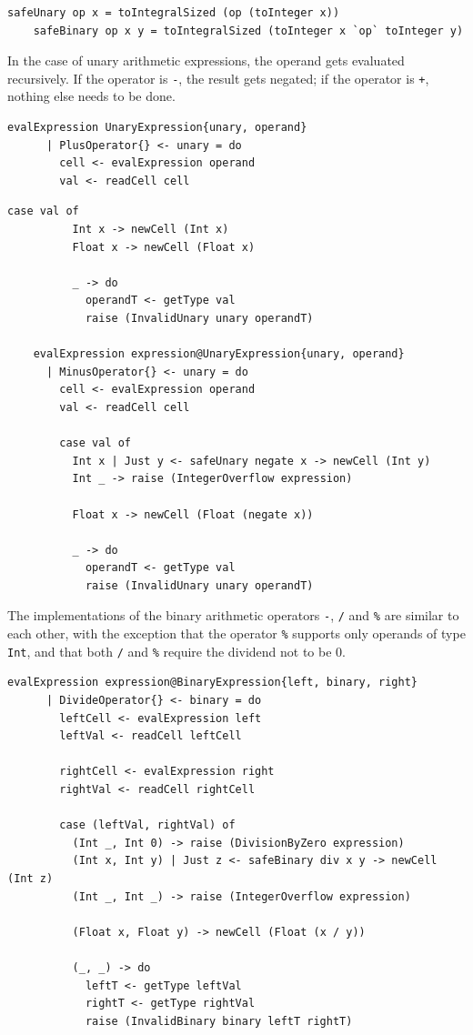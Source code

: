 \documentclass[UdineBachThesis,american,11pt]{PhdThesis}
\begin{document}
  \begin{Verbatim}[gobble=4,fontsize=\small]
    safeUnary op x = toIntegralSized (op (toInteger x))
    safeBinary op x y = toIntegralSized (toInteger x `op` toInteger y)
  \end{Verbatim}

  In the case of unary arithmetic expressions, the operand gets evaluated
  recursively. If the operator is \texttt{-}, the result gets negated; if the
  operator is \texttt{+}, nothing else needs to be done.

  \begin{Verbatim}[gobble=4,fontsize=\small]
    evalExpression UnaryExpression{unary, operand}
      | PlusOperator{} <- unary = do
        cell <- evalExpression operand
        val <- readCell cell
  \end{Verbatim}

  \pagebreak

  \begin{Verbatim}[gobble=4,fontsize=\small]
        case val of
          Int x -> newCell (Int x)
          Float x -> newCell (Float x)

          _ -> do
            operandT <- getType val
            raise (InvalidUnary unary operandT)

    evalExpression expression@UnaryExpression{unary, operand}
      | MinusOperator{} <- unary = do
        cell <- evalExpression operand
        val <- readCell cell

        case val of
          Int x | Just y <- safeUnary negate x -> newCell (Int y)
          Int _ -> raise (IntegerOverflow expression)

          Float x -> newCell (Float (negate x))

          _ -> do
            operandT <- getType val
            raise (InvalidUnary unary operandT)
  \end{Verbatim}

  The implementations of the binary arithmetic operators \texttt{-}, \texttt{/}
  and \texttt{\%} are similar to each other, with the exception that the
  operator \texttt{\%} supports only operands of type \mbox{\texttt{Int}}, and
  that both \texttt{/} and \texttt{\%} require the dividend not to be 0.

  \begin{Verbatim}[gobble=4,fontsize=\small]
    evalExpression expression@BinaryExpression{left, binary, right}
      | DivideOperator{} <- binary = do
        leftCell <- evalExpression left
        leftVal <- readCell leftCell

        rightCell <- evalExpression right
        rightVal <- readCell rightCell

        case (leftVal, rightVal) of
          (Int _, Int 0) -> raise (DivisionByZero expression)
          (Int x, Int y) | Just z <- safeBinary div x y -> newCell (Int z)
          (Int _, Int _) -> raise (IntegerOverflow expression)

          (Float x, Float y) -> newCell (Float (x / y))

          (_, _) -> do
            leftT <- getType leftVal
            rightT <- getType rightVal
            raise (InvalidBinary binary leftT rightT)
  \end{Verbatim}
\end{document}
